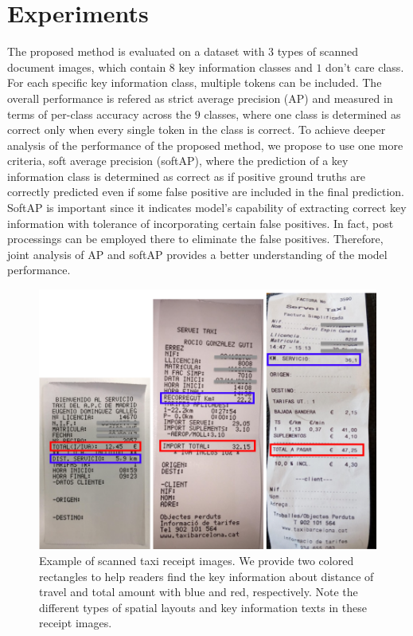 \documentclass[10pt,twocolumn,letterpaper]{article}
\begin{document}
\section{Experiments}
\label{experiment}
The proposed method is evaluated on a dataset with $3$ types of scanned document images, which contain $8$ key information classes and $1$ don't care class. For each specific key information class, multiple tokens can be included. The overall performance is refered as strict average precision (AP) and measured in terms of per-class accuracy across the $9$ classes, where one class is determined as correct only when every single token in the class is correct. To achieve deeper analysis of the performance of the proposed method, we propose to use one more criteria, soft average precision (softAP), where the prediction of a key information class is determined as correct as if positive ground truths are correctly predicted even if some false positive are included in the final prediction. SoftAP is important since it indicates model's capability of extracting correct key information with tolerance of incorporating certain false positives. In fact, post processings can be employed there to eliminate the false positives. Therefore, joint analysis of AP and softAP provides a better understanding of the model performance.

\begin{figure}
\begin{center}
\includegraphics[width=0.99\linewidth]{Receipts.png}
\end{center}
   \caption{Example of scanned taxi receipt images. We provide two colored rectangles to help readers find the key information about distance of travel and total amount with blue and red, respectively. Note the different types of spatial layouts and key information texts in these receipt images.}
\label{fig:receipts}
\end{figure}
\end{document}

